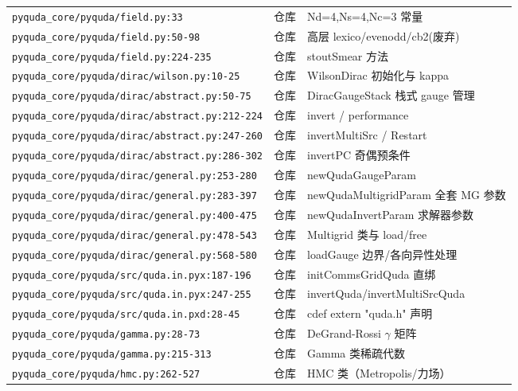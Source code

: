 \documentclass[UTF8]{ctexart}
\begin{document}
\begin{xltabular}{\textwidth}{llX}
\texttt{\nolinkurl{pyquda_core/pyquda/field.py:33}} & 仓库 & Nd=4,Ns=4,Nc=3 常量 \\
\texttt{\nolinkurl{pyquda_core/pyquda/field.py:50-98}} & 仓库 & 高层 lexico/evenodd/cb2(废弃) \\
\texttt{\nolinkurl{pyquda_core/pyquda/field.py:224-235}} & 仓库 & stoutSmear 方法 \\
\texttt{\nolinkurl{pyquda_core/pyquda/dirac/wilson.py:10-25}} & 仓库 & WilsonDirac 初始化与 kappa \\
\texttt{\nolinkurl{pyquda_core/pyquda/dirac/abstract.py:50-75}} & 仓库 & DiracGaugeStack 栈式 gauge 管理 \\
\texttt{\nolinkurl{pyquda_core/pyquda/dirac/abstract.py:212-224}} & 仓库 & invert / performance \\
\texttt{\nolinkurl{pyquda_core/pyquda/dirac/abstract.py:247-260}} & 仓库 & invertMultiSrc / Restart \\
\texttt{\nolinkurl{pyquda_core/pyquda/dirac/abstract.py:286-302}} & 仓库 & invertPC 奇偶预条件 \\
\texttt{\nolinkurl{pyquda_core/pyquda/dirac/general.py:253-280}} & 仓库 & newQudaGaugeParam \\
\texttt{\nolinkurl{pyquda_core/pyquda/dirac/general.py:283-397}} & 仓库 & newQudaMultigridParam 全套 MG 参数 \\
\texttt{\nolinkurl{pyquda_core/pyquda/dirac/general.py:400-475}} & 仓库 & newQudaInvertParam 求解器参数 \\
\texttt{\nolinkurl{pyquda_core/pyquda/dirac/general.py:478-543}} & 仓库 & Multigrid 类与 load/free \\
\texttt{\nolinkurl{pyquda_core/pyquda/dirac/general.py:568-580}} & 仓库 & loadGauge 边界/各向异性处理 \\
\texttt{\nolinkurl{pyquda_core/pyquda/src/quda.in.pyx:187-196}} & 仓库 & initCommsGridQuda 直绑 \\
\texttt{\nolinkurl{pyquda_core/pyquda/src/quda.in.pyx:247-255}} & 仓库 & invertQuda/invertMultiSrcQuda \\
\texttt{\nolinkurl{pyquda_core/pyquda/src/quda.in.pxd:28-45}} & 仓库 & cdef extern "quda.h" 声明 \\
\texttt{\nolinkurl{pyquda_core/pyquda/gamma.py:28-73}} & 仓库 & DeGrand-Rossi $\gamma$ 矩阵 \\
\texttt{\nolinkurl{pyquda_core/pyquda/gamma.py:215-313}} & 仓库 & Gamma 类稀疏代数 \\
\texttt{\nolinkurl{pyquda_core/pyquda/hmc.py:262-527}} & 仓库 & HMC 类（Metropolis/力场） \\

\end{xltabular}
\end{document}
